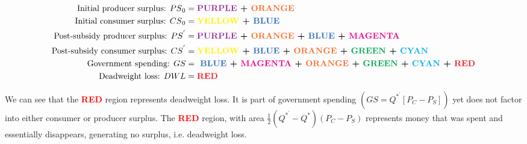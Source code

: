 \documentclass[]{article}
\begin{document}
\begin{align}
	\textnormal{Initial producer surplus: } {PS}_0 &= \textbf{\textcolor{Purple}{PURPLE} + \textcolor{Orange}{ORANGE}} \\
	\textnormal{Initial consumer surplus: } {CS}_0 &= \textbf{\textcolor{Yellow}{YELLOW} + \textcolor{NavyBlue}{BLUE}} \\
	\textnormal{Post-subsidy producer surplus: } {PS}^{'} &=\textbf{\textcolor{Purple}{PURPLE} + \textcolor{Orange}{ORANGE} + \textcolor{NavyBlue}{BLUE} + \textcolor{Magenta}{MAGENTA}} \\
	\textnormal{Post-subsidy consumer surplus: } {CS}^{'} &=\textbf{\textcolor{Yellow}{YELLOW} + \textcolor{NavyBlue}{BLUE} + \textcolor{Orange}{ORANGE} + \textcolor{Green}{GREEN} + \textcolor{Cyan}{CYAN}} \\
	\textnormal{Government spending: } GS &= \textbf{ \textcolor{NavyBlue}{BLUE} + \textcolor{Magenta}{MAGENTA} + \textcolor{Orange}{ORANGE} + \textcolor{Green}{GREEN} + \textcolor{Cyan}{CYAN} + \textcolor{Red}{RED}} \\
	\textnormal{Deadweight loss: } DWL &= \textbf{\textcolor{Red}{RED}}
\end{align}


We can see that the \textbf{\textcolor{Red}{RED}} region represents deadweight loss. It is part of government spending $(GS = Q^{*^{'}}[P_C - P_S])$ yet does not factor into either consumer or producer surplus. The \textbf{\textcolor{Red}{RED}} region, with area $\frac{1}{2} ( Q^{*^{'}} - Q^*)(P_C-P_S)$ represents money that was spent and essentially disappears, generating no surplus, i.e. deadweight loss. 
\end{document}
